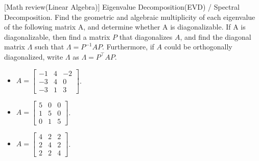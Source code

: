 \item {} [Math review(Linear Algebra)] Eigenvalue Decomposition(EVD) / Spectral Decomposition.
Find the geometric and algebraic multiplicity of each eigenvalue of the following matrix A, and determine whether A is diagonalizable. If A is diagonalizable, then find a matrix $P$ that diagonalizes $A$, and find the diagonal matrix $\Lambda$ such that $\Lambda = P^{-1}AP$. Furthermore, if $A$ could be orthogonally diagonalized, write $\Lambda$ as $\Lambda = P^{\top}AP$.

\begin{itemize}
    \item[(a)] $A=\begin{bmatrix} -1 & 4 & -2 \\ -3 & 4 & 0 \\ -3 & 1 & 3 \end{bmatrix}$. ~
    \item[(b)] $A=\begin{bmatrix} 5 & 0 & 0 \\ 1 & 5 & 0 \\ 0 & 1 & 5 \end{bmatrix}$. ~
    \item[(c)] $A=\begin{bmatrix} 4 & 2 & 2 \\ 2 & 4 & 2 \\ 2 & 2 & 4 \end{bmatrix}$. ~
\end{itemize}

